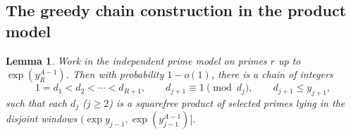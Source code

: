 \documentclass[11pt,reqno]{amsart}
\theoremstyle{plain}
\newtheorem{lemma}[theorem]{Lemma}
\theoremstyle{definition}
\begin{document}
\subsection{The greedy chain construction in the product model}

\begin{lemma}\label{lem:greedy-H}
Work in the independent prime model on primes $r$ up to $\exp(y_R^{A-1})$. Then with probability $1-o(1)$, there is a chain of integers
\begin{equation}\label{eq:H-chain}
1=d_1<d_2<\cdots<d_{R+1}, \qquad d_{j+1}\equiv 1\pmod{d_j},\qquad d_{j+1}\le y_{j+1},
\end{equation}
such that each $d_j$ ($j\ge 2$) is a squarefree product of selected primes lying in the disjoint windows $\bigl(\exp y_{j-1},\exp(y_{j-1}^{A-1})\bigr]$.
\end{lemma}
\end{document}

